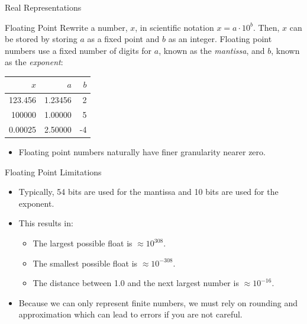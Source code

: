 \documentclass[serif,xcolor=pdftex,dvipsnames,table,hyperref={bookmarks=false,breaklinks}]{beamer}
\begin{document}
\begin{frame}[t]{Real Representations}
	\begin{block}{Floating Point}
		Rewrite a number, $x$, in scientific notation $x = a\cdot 10^b$. Then, $x$ can be stored by storing $a$ as a fixed point and $b$ as an integer. Floating point numbers use a fixed number of digits for $a$, known as the \textit{mantissa}, and $b$, known as the \textit{exponent}:
		
		\pause
		\centering
		\begin{tabular}{|r|r|r|}\hline
			$x$ & $a$ & $b$\\\hline
			123.456 & 1.23456 & 2\\
			100000 & 1.00000 & 5\\
			0.00025 & 2.50000 & -4\\\hline
		\end{tabular}
	\end{block}
	\pause
	\begin{itemize}[<+->]
		\item Floating point numbers naturally have finer granularity nearer zero.
	\end{itemize}
\end{frame}

\begin{frame}[t]{Floating Point Limitations}
	\begin{itemize}[<+->]
		\item Typically, 54 bits are used for the mantissa and 10 bits are used for the exponent.
		\item This results in:
		\begin{itemize}[<+->]
			\item The largest possible float is $\approx 10^{308}$.
			\item The smallest possible float is $\approx 10^{-308}$.
			\item The distance between 1.0 and the next largest number is $\approx 10^{-16}$.
		\end{itemize}
		\item Because we can only represent finite numbers, we must rely on rounding and approximation which can lead to errors if you are not careful.
	\end{itemize}
\end{frame}
\end{document}
